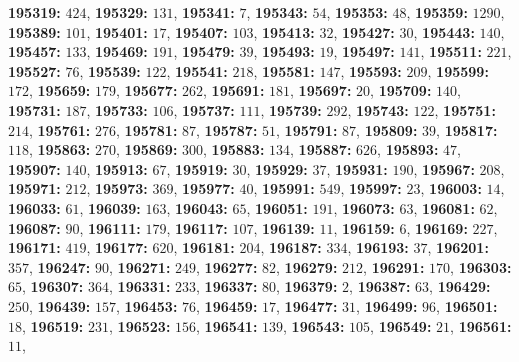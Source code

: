 \textsf{\bfseries 195319:} $424$, \textsf{\bfseries 195329:} $131$, \textsf{\bfseries 195341:} $7$, \textsf{\bfseries 195343:} $54$, \textsf{\bfseries 195353:} $48$, \textsf{\bfseries 195359:} $1290$, \textsf{\bfseries 195389:} $101$, \textsf{\bfseries 195401:} $17$, \textsf{\bfseries 195407:} $103$, \textsf{\bfseries 195413:} $32$, \textsf{\bfseries 195427:} $30$, \textsf{\bfseries 195443:} $140$, \textsf{\bfseries 195457:} $133$, \textsf{\bfseries 195469:} $191$, \textsf{\bfseries 195479:} $39$, \textsf{\bfseries 195493:} $19$, \textsf{\bfseries 195497:} $141$, \textsf{\bfseries 195511:} $221$, \textsf{\bfseries 195527:} $76$, \textsf{\bfseries 195539:} $122$, \textsf{\bfseries 195541:} $218$, \textsf{\bfseries 195581:} $147$, \textsf{\bfseries 195593:} $209$, \textsf{\bfseries 195599:} $172$, \textsf{\bfseries 195659:} $179$, \textsf{\bfseries 195677:} $262$, \textsf{\bfseries 195691:} $181$, \textsf{\bfseries 195697:} $20$, \textsf{\bfseries 195709:} $140$, \textsf{\bfseries 195731:} $187$, \textsf{\bfseries 195733:} $106$, \textsf{\bfseries 195737:} $111$, \textsf{\bfseries 195739:} $292$, \textsf{\bfseries 195743:} $122$, \textsf{\bfseries 195751:} $214$, \textsf{\bfseries 195761:} $276$, \textsf{\bfseries 195781:} $87$, \textsf{\bfseries 195787:} $51$, \textsf{\bfseries 195791:} $87$, \textsf{\bfseries 195809:} $39$, \textsf{\bfseries 195817:} $118$, \textsf{\bfseries 195863:} $270$, \textsf{\bfseries 195869:} $300$, \textsf{\bfseries 195883:} $134$, \textsf{\bfseries 195887:} $626$, \textsf{\bfseries 195893:} $47$, \textsf{\bfseries 195907:} $140$, \textsf{\bfseries 195913:} $67$, \textsf{\bfseries 195919:} $30$, \textsf{\bfseries 195929:} $37$, \textsf{\bfseries 195931:} $190$, \textsf{\bfseries 195967:} $208$, \textsf{\bfseries 195971:} $212$, \textsf{\bfseries 195973:} $369$, \textsf{\bfseries 195977:} $40$, \textsf{\bfseries 195991:} $549$, \textsf{\bfseries 195997:} $23$, \textsf{\bfseries 196003:} $14$, \textsf{\bfseries 196033:} $61$, \textsf{\bfseries 196039:} $163$, \textsf{\bfseries 196043:} $65$, \textsf{\bfseries 196051:} $191$, \textsf{\bfseries 196073:} $63$, \textsf{\bfseries 196081:} $62$, \textsf{\bfseries 196087:} $90$, \textsf{\bfseries 196111:} $179$, \textsf{\bfseries 196117:} $107$, \textsf{\bfseries 196139:} $11$, \textsf{\bfseries 196159:} $6$, \textsf{\bfseries 196169:} $227$, \textsf{\bfseries 196171:} $419$, \textsf{\bfseries 196177:} $620$, \textsf{\bfseries 196181:} $204$, \textsf{\bfseries 196187:} $334$, \textsf{\bfseries 196193:} $37$, \textsf{\bfseries 196201:} $357$, \textsf{\bfseries 196247:} $90$, \textsf{\bfseries 196271:} $249$, \textsf{\bfseries 196277:} $82$, \textsf{\bfseries 196279:} $212$, \textsf{\bfseries 196291:} $170$, \textsf{\bfseries 196303:} $65$, \textsf{\bfseries 196307:} $364$, \textsf{\bfseries 196331:} $233$, \textsf{\bfseries 196337:} $80$, \textsf{\bfseries 196379:} $2$, \textsf{\bfseries 196387:} $63$, \textsf{\bfseries 196429:} $250$, \textsf{\bfseries 196439:} $157$, \textsf{\bfseries 196453:} $76$, \textsf{\bfseries 196459:} $17$, \textsf{\bfseries 196477:} $31$, \textsf{\bfseries 196499:} $96$, \textsf{\bfseries 196501:} $18$, \textsf{\bfseries 196519:} $231$, \textsf{\bfseries 196523:} $156$, \textsf{\bfseries 196541:} $139$, \textsf{\bfseries 196543:} $105$, \textsf{\bfseries 196549:} $21$, \textsf{\bfseries 196561:} $11$, 
